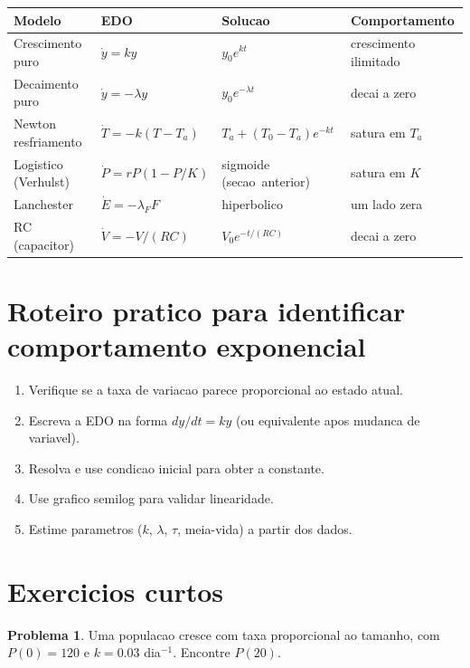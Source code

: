 \documentclass[12pt,a4paper,oneside]{book}
\theoremstyle{definition}
\newtheorem{problem}{Problema}
\begin{document}
\begin{center}
\begin{tabular}{llll}
\toprule
\textbf{Modelo} & \textbf{EDO} & \textbf{Solucao} & \textbf{Comportamento} \\
\midrule
Crescimento puro  & $\dot{y}=ky$ & $y_0e^{kt}$ & crescimento ilimitado \\
Decaimento puro   & $\dot{y}=-\lambda y$ & $y_0e^{-\lambda t}$ & decai a zero \\
Newton resfriamento & $\dot{T}=-k(T-T_a)$ & $T_a+(T_0-T_a)e^{-kt}$ & satura em $T_a$ \\
Logistico (Verhulst) & $\dot{P}=rP(1-P/K)$ & sigmoide (secao~anterior) & satura em $K$ \\
Lanchester & $\dot{E}=-\lambda_F F$ & hiperbolico & um lado zera \\
RC (capacitor) & $\dot{V}=-V/(RC)$ & $V_0e^{-t/(RC)}$ & decai a zero \\
\bottomrule
\end{tabular}
\end{center}

\section{Roteiro pratico para identificar comportamento exponencial}

\begin{enumerate}
    \item Verifique se a taxa de variacao parece proporcional ao estado atual.
    \item Escreva a EDO na forma $dy/dt=ky$ (ou equivalente apos mudanca de variavel).
    \item Resolva e use condicao inicial para obter a constante.
    \item Use grafico semilog para validar linearidade.
    \item Estime parametros ($k$, $\lambda$, $\tau$, meia-vida) a partir dos dados.
\end{enumerate}

\section{Exercicios curtos}

\begin{problem}
Uma populacao cresce com taxa proporcional ao tamanho, com $P(0)=120$ e $k=0.03$ dia$^{-1}$. Encontre $P(20)$.
\end{problem}
\end{document}
